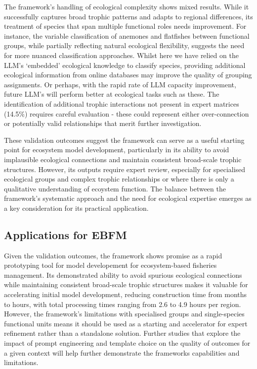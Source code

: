 The framework's handling of ecological complexity shows mixed results. While it successfully captures broad trophic patterns and adapts to regional differences, its treatment of species that span multiple functional roles needs improvement. For instance, the variable classification of anemones and flatfishes between functional groups, while partially reflecting natural ecological flexibility, suggests the need for more nuanced classification approaches. Whilst here we have relied on the LLM's `embedded' ecological knowledge to classify species, providing additional ecological information from online databases may improve the quality of grouping assignments. Or perhaps, with the rapid rate of LLM capacity improvement, future LLM's will perform better at ecological tasks such as these. The identification of additional trophic interactions not present in expert matrices (14.5\%) requires careful evaluation - these could represent either over-connection or potentially valid relationships that merit further investigation.

These validation outcomes suggest the framework can serve as a useful starting point for ecosystem model development, particularly in its ability to avoid implausible ecological connections and maintain consistent broad-scale trophic structures. However, its outputs require expert review, especially for specialised ecological groups and complex trophic relationships or where there is only a qualitative understanding of ecoystem function. The balance between the framework's systematic approach and the need for ecological expertise emerges as a key consideration for its practical application.

\subsection{Applications for EBFM}

Given the validation outcomes, the framework shows promise as a rapid prototyping tool for model developement for ecosystem-based fisheries management. Its demonstrated ability to avoid spurious ecological connections while maintaining consistent broad-scale trophic structures makes it valuable for accelerating initial model development, reducing construction time from months to hours, with total processing times ranging from 2.6 to 4.9 hours per region. However, the framework's limitations with specialised groups and single-species functional units means it should be used as a starting and accelerator for expert refinement rather than a standalone solution. Further studies that explore the impact of prompt engineering and template choice on the quality of outcomes for a given context will help further demonstrate the frameworks capabilities and limitations.


